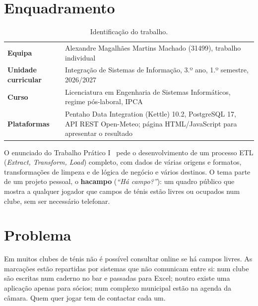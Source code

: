 \documentclass[11pt,a4paper]{article}
\newcommand{\anoLetivo}{2026/2027}
\newcommand{\alunoNome}{Alexandre Magalhães Martins Machado}
\newcommand{\alunoNum}{31499}
\begin{document}
\tableofcontents
\newpage

\section{Enquadramento}

\begin{table}[H]
\centering
\caption{Identificação do trabalho.}
\label{tab:identificacao}
\renewcommand{\arraystretch}{1.2}
\begin{tabular}{@{}p{3.4cm}p{11.4cm}@{}}
\toprule
\textbf{Equipa} & \alunoNome{} (\alunoNum), trabalho individual \\
\textbf{Unidade curricular} & Integração de Sistemas de Informação, 3.º ano, 1.º semestre, \anoLetivo \\
\textbf{Curso} & Licenciatura em Engenharia de Sistemas Informáticos, regime pós-laboral, IPCA \\
\textbf{Plataformas} & Pentaho Data Integration (Kettle) 10.2, PostgreSQL 17, API REST Open-Meteo; página HTML/JavaScript para apresentar o resultado \\
\bottomrule
\end{tabular}
\end{table}

O enunciado do Trabalho Prático I~\cite{enunciado} pede o desenvolvimento de um processo ETL (\textit{Extract, Transform, Load}) completo, com dados de várias origens e formatos, transformações de limpeza e de lógica de negócio e vários destinos. O tema parte de um projeto pessoal, o \textbf{hacampo} (\textit{``Há campo?''}): um quadro público que mostra a qualquer jogador que campos de ténis estão livres ou ocupados num clube, sem ser necessário telefonar.

\section{Problema}

Em muitos clubes de ténis não é possível consultar online se há campos livres. As marcações estão repartidas por sistemas que não comunicam entre si: num clube são escritas num caderno no bar e passadas para Excel; noutro existe uma aplicação apenas para sócios; num complexo municipal estão na agenda da câmara. Quem quer jogar tem de contactar cada um.
\end{document}
